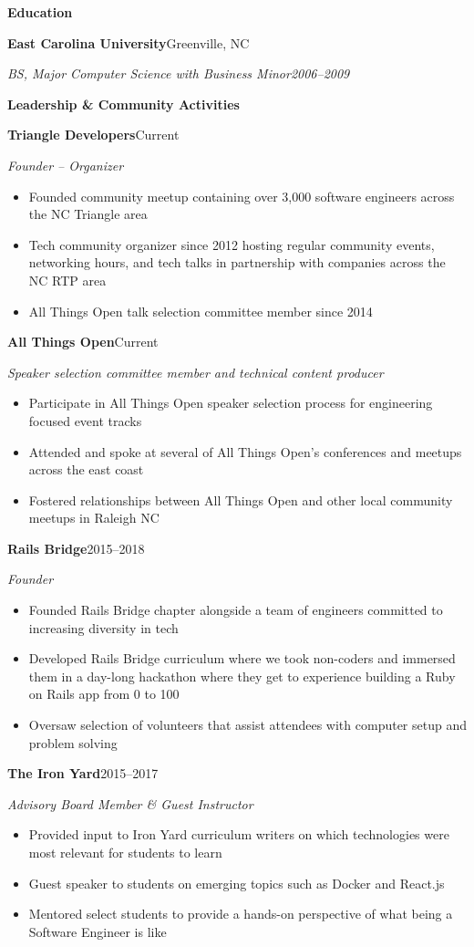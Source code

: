 \documentclass[10pt,letterpaper]{article}
\newcommand{\resumesection}[1]{%
  \par\addvspace{9pt}
  {\centering\large\bfseries #1\par}
  \vspace{5pt}
}
\newcommand{\resumeentry}[4]{%
  \par\addvspace{6pt}
  {\bfseries #1}\hfill #2\par
  \textit{#3}\hfill \textit{#4}\par
}
\newenvironment{resumebullets}{%
  \begin{itemize}[
    leftmargin=1.5em,
    label=\textbullet,
    itemsep=1pt,
    parsep=0pt,
    topsep=3pt,
    partopsep=0pt
  ]
}{%
  \end{itemize}
}
\begin{document}
\newpage

\resumesection{Education}

\resumeentry{East Carolina University}{Greenville, NC}
  {BS, Major Computer Science with Business Minor}{2006--2009}

\resumesection{Leadership \& Community Activities}

\resumeentry{Triangle Developers}{Current}
  {Founder -- Organizer}{}
\begin{resumebullets}
  \item Founded community meetup containing over 3,000 software engineers across the NC Triangle area
  \item Tech community organizer since 2012 hosting regular community events, networking hours, and tech talks in partnership with companies across the NC RTP area
  \item All Things Open talk selection committee member since 2014
\end{resumebullets}

\resumeentry{All Things Open}{Current}
  {Speaker selection committee member and technical content producer}{}
\begin{resumebullets}
  \item Participate in All Things Open speaker selection process for engineering focused event tracks
  \item Attended and spoke at several of All Things Open's conferences and meetups across the east coast
  \item Fostered relationships between All Things Open and other local community meetups in Raleigh NC
\end{resumebullets}

\resumeentry{Rails Bridge}{2015--2018}
  {Founder}{}
\begin{resumebullets}
  \item Founded Rails Bridge chapter alongside a team of engineers committed to increasing diversity in tech
  \item Developed Rails Bridge curriculum where we took non-coders and immersed them in a day-long hackathon where they get to experience building a Ruby on Rails app from 0 to 100
  \item Oversaw selection of volunteers that assist attendees with computer setup and problem solving
\end{resumebullets}

\resumeentry{The Iron Yard}{2015--2017}
  {Advisory Board Member \& Guest Instructor}{}
\begin{resumebullets}
  \item Provided input to Iron Yard curriculum writers on which technologies were most relevant for students to learn
  \item Guest speaker to students on emerging topics such as Docker and React.js
  \item Mentored select students to provide a hands-on perspective of what being a Software Engineer is like
\end{resumebullets}
\end{document}
